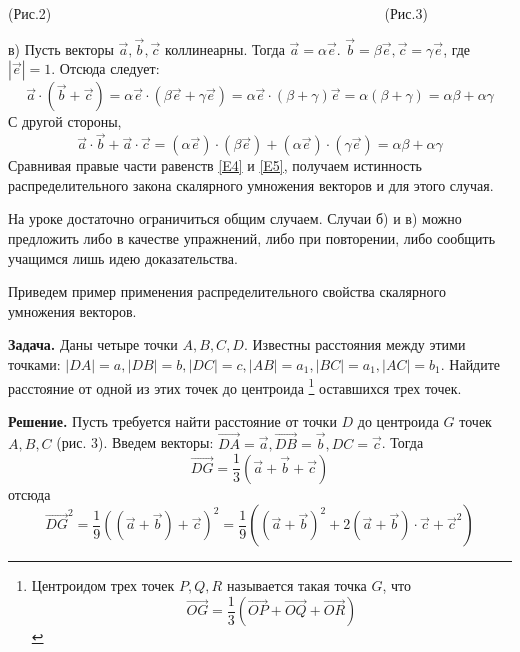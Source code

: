 \documentclass{article}
\begin{document}
(Рис.2)$\hspace{10cm}$(Рис.3)
\par в) Пусть векторы $\overrightarrow{a},\overrightarrow{b},\overrightarrow{c}$ коллинеарны. Тогда $\overrightarrow{a}=\alpha\overrightarrow{e}$. $\overrightarrow{b}=\beta\overrightarrow{e},\overrightarrow{c}=\gamma\overrightarrow{e}$, где $|\overrightarrow{e}|=1$. Отсюда следует:
\begin{equation}\label{E4}
\overrightarrow{a}\cdot(\overrightarrow{b}+\overrightarrow{c})=\alpha\overrightarrow{e}\cdot(\beta\overrightarrow{e}+\gamma\overrightarrow{e})=\alpha\overrightarrow{e}\cdot(\beta+\gamma)\overrightarrow{e}=\alpha(\beta+\gamma)=\alpha\beta+\alpha\gamma
\end{equation}
С другой стороны,
\begin{equation}\label{E5}
\overrightarrow{a}\cdot\overrightarrow{b}+\overrightarrow{a}\cdot\overrightarrow{c}=(\alpha\overrightarrow{e})\cdot(\beta\overrightarrow{e})+(\alpha\overrightarrow{e})\cdot(\gamma\overrightarrow{e})=\alpha\beta+\alpha\gamma
\end{equation}
Сравнивая правые части равенств \eqref{E4} и \eqref{E5}, получаем истинность распределительного закона скалярного умножения векторов и для этого случая.
\par На уроке достаточно ограничиться общим случаем. Случаи б) и в) можно предложить либо в качестве упражнений, либо при повторении, либо сообщить учащимся лишь идею доказательства.
\par Приведем пример применения распределительного свойства скалярного умножения векторов.
\par \textbf{Задача.} Даны четыре точки $A,B,C,D$. Известны расстояния между этими точками: $|DA|=a,|DB|=b,|DC|=c,|AB|=a_1,|BC|=a_1,|AC|=b_1$. Найдите расстояние от одной из этих точек до центроида \footnote[1]{Центроидом трех точек $P,Q,R$ называется такая точка $G$, что $$\overrightarrow{OG}=\frac{1}{3}(\overrightarrow{OP}+\overrightarrow{OQ}+\overrightarrow{OR})$$} оставшихся трех точек.
\par\textbf{Решение.} Пусть требуется найти расстояние от точки $D$ до центроида $G$ точек $A,B,C$ (рис. 3). Введем векторы: $\overrightarrow{DA}=\overrightarrow{a},\overrightarrow{DB}=\overrightarrow{b},DC=\overrightarrow{c}$. Тогда
$$\overrightarrow{DG}=\frac{1}{3}(\overrightarrow{a}+\overrightarrow{b}+\overrightarrow{c})$$
отсюда 
$$\overrightarrow{DG}^2=\frac{1}{9}((\overrightarrow{a}+\overrightarrow{b})+\overrightarrow{c})^2=\frac{1}{9}((\overrightarrow{a}+\overrightarrow{b})^2+2(\overrightarrow{a}+\overrightarrow{b})\cdot\overrightarrow{c}+\overrightarrow{c}^2)$$
\end{document}
